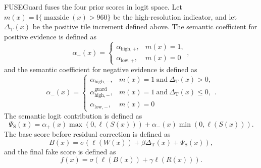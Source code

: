 \documentclass[letterpaper,journal]{IEEEtran}
\begin{document}
FUSEGuard fuses the four prior scores in logit space. Let $m(x)=\mathbb{I}\{\operatorname{maxside}(x)>960\}$ be the high-resolution indicator, and let $\Delta_{\mathrm{T}}(x)$ be the positive tile increment defined above. The semantic coefficient for positive evidence is defined as
\[
    \alpha_{+}(x)=
    \begin{cases}
    \alpha_{\mathrm{high},+}, & m(x)=1,\\
    \alpha_{\mathrm{low},+}, & m(x)=0
    \end{cases},
\]
and the semantic coefficient for negative evidence is defined as
\[
    \alpha_{-}(x)=
    \begin{cases}
    \alpha_{\mathrm{high},-}, & m(x)=1 \ \mathrm{and}\ \Delta_{\mathrm{T}}(x)>0,\\
    \alpha_{\mathrm{high},-}^{\mathrm{guard}}, & m(x)=1 \ \mathrm{and}\ \Delta_{\mathrm{T}}(x)\leq 0,\\
    \alpha_{\mathrm{low},-}, & m(x)=0
    \end{cases}.
\]
The semantic logit contribution is defined as
\[
    \Psi_{\mathrm{S}}(x)=\alpha_{+}(x)\max(0,\ell(S(x)))+
    \alpha_{-}(x)\min(0,\ell(S(x))).
\]
The base score before residual correction is defined as
\[
    B(x)=\sigma\left(\ell(W(x))+\beta \Delta_{\mathrm{T}}(x)+\Psi_{\mathrm{S}}(x)\right),
\]
and the final fake score is defined as
\[
    f(x)=\sigma\left(\ell(B(x))+\gamma \ell(R(x))\right).
\]
\end{document}
